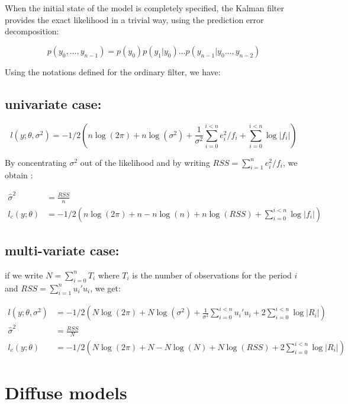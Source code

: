 \documentclass[
  letterpaper,
  DIV=11,
  numbers=noendperiod]{scrreprt}
\begin{document}
When the initial state of the model is completely specified, the Kalman
filter provides the exact likelihood in a trivial way, using the
prediction error decomposition:

\[ p(y_0, \ldots, y_{n-1}) = p(y_0) p(y_1\vert y_0) \ldots p(y_{n-1}\vert y_0 \ldots, y_{n-2})\]

Using the notations defined for the ordinary filter, we have:

\subsection{univariate case:}\label{univariate-case}

\[
l(y;\theta, \sigma^2)=-1/2\left(n \log(2 \pi) + n \log(\sigma^2)  +  \frac{1}{\sigma^2}\sum_{i=0}^{i<n} e_i^2/f_i + \sum_{i=0}^{i<n} {\log \vert f_i \vert }\right)
\]

By concentrating \(\sigma^2\) out of the likelihood and by writing
\(RSS=\sum_{i=1}^n e_i^2/f_i\), we obtain :

\[
\begin{align*}
\hat{\sigma}^2 &= \frac{RSS}{n} \\
l_c(y; \theta)&=-1/2\left(n \log(2 \pi) + n - n \log(n) + n \log(RSS) + \sum_{i=0}^{i<n} {\log \vert f_i \vert }\right)
\end{align*}
\]

\subsection{multi-variate case:}\label{multi-variate-case}

if we write \(N=\sum_{i=0}^n{T_i}\) where \(T_i\) is the number of
observations for the period \(i\) and \(RSS=\sum_{i=1}^n u_i'u_i\), we
get:

\[
\begin{align*}
l(y; \theta, \sigma^2) &=-1/2\left(N \log(2 \pi) + N \log(\sigma^2)  +  \frac{1}{\sigma^2}\sum_{i=0}^{i<n} u_i'u_i + 2\sum_{i=0}^{i<n} {\log \vert R_i \vert }\right) \\
\hat{\sigma}^2 &= \frac{RSS}{N} \\
l_c(y; \theta) &=-1/2\left(N \log(2 \pi) + N  -N \log(N) + N\log(RSS) + 2\sum_{i=0}^{i<n} {\log \vert R_i \vert }\right) 
\end{align*}
\]

\section{Diffuse models}\label{diffuse-models}
\end{document}
